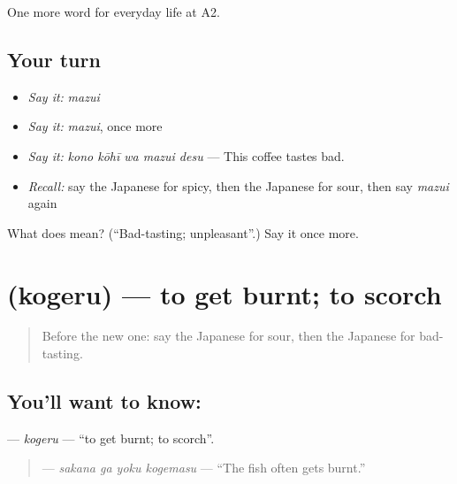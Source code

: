 \begin{grammarlens}[title={What you've built}]
One more word for everyday life at A2.
\end{grammarlens}

\subsection*{Your turn}
\begin{itemize}
\raggedright
  \item \emph{Say it:} \emph{mazui}
  \item \emph{Say it:} \emph{mazui}, once more
  \item \emph{Say it:} \emph{kono kōhī wa mazui desu} — This coffee tastes bad.
  \item \emph{Recall:} say the Japanese for spicy, then the Japanese for sour, then say \emph{mazui} again
\end{itemize}

\begin{tcolorbox}[breakable,colback=teal!4,colframe=teal!35!black,title={Before you move on}]
What does  mean? (\textquotedblleft{}Bad-tasting; unpleasant\textquotedblright{}.) Say it once more.
\end{tcolorbox}
\section[\texorpdfstring{\ja{こげる} (kogeru)}{こげる (kogeru)}]{ (kogeru) — to get burnt; to scorch}

\label{lesson:JA-C177-kogeru}



\begin{quote}
Before the new one: say the Japanese for sour, then the Japanese for bad-tasting.
\end{quote}

\subsection*{You'll want to know: }
\textbf{} — \emph{kogeru} — \textquotedblleft{}to get burnt; to scorch\textquotedblright{}.

\begin{quote}
\textbf{  } — \emph{sakana ga yoku kogemasu} — \textquotedblleft{}The fish often gets burnt.\textquotedblright{}
\end{quote}

